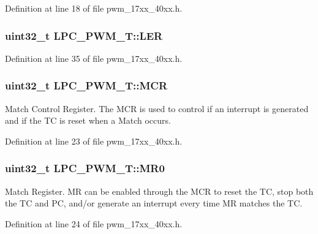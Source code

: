 Definition at line 18 of file pwm\+\_\+17xx\+\_\+40xx.\+h.

\subsubsection[{\texorpdfstring{L\+ER}{LER}}]{ uint32\+\_\+t L\+P\+C\+\_\+\+P\+W\+M\+\_\+\+T\+::\+L\+ER}\hypertarget{structLPC__PWM__T_af29d566c4adc940d0f11e36697205ede}{}\label{structLPC__PWM__T_af29d566c4adc940d0f11e36697205ede}


Definition at line 35 of file pwm\+\_\+17xx\+\_\+40xx.\+h.

\subsubsection[{\texorpdfstring{M\+CR}{MCR}}]{ uint32\+\_\+t L\+P\+C\+\_\+\+P\+W\+M\+\_\+\+T\+::\+M\+CR}\hypertarget{structLPC__PWM__T_af7658010858227b5c56d5af3da2010c5}{}\label{structLPC__PWM__T_af7658010858227b5c56d5af3da2010c5}
Match Control Register. The M\+CR is used to control if an interrupt is generated and if the TC is reset when a Match occurs. 

Definition at line 23 of file pwm\+\_\+17xx\+\_\+40xx.\+h.

\subsubsection[{\texorpdfstring{M\+R0}{MR0}}]{ uint32\+\_\+t L\+P\+C\+\_\+\+P\+W\+M\+\_\+\+T\+::\+M\+R0}\hypertarget{structLPC__PWM__T_a1ca9cba93b958a8d01e402676096a833}{}\label{structLPC__PWM__T_a1ca9cba93b958a8d01e402676096a833}
Match Register. MR can be enabled through the M\+CR to reset the TC, stop both the TC and PC, and/or generate an interrupt every time MR matches the TC. 

Definition at line 24 of file pwm\+\_\+17xx\+\_\+40xx.\+h.

